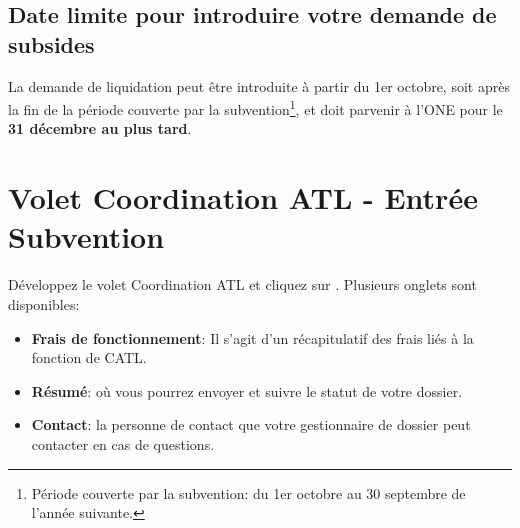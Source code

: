 \subsection{Date limite pour introduire votre demande de subsides}
\begin{attention}
La demande de liquidation peut être introduite à partir du 1er octobre, soit après la fin de la période couverte par la subvention\footnote{Période couverte par la subvention: du 1er octobre au 30 septembre de l'année suivante.},  et doit parvenir à l'ONE pour le \textcolor{rouge}{\textbf{31 décembre au plus tard}}.
\end{attention}



\section{Volet Coordination ATL - Entrée Subvention}
Développez le volet Coordination ATL et cliquez sur . Plusieurs onglets sont disponibles: 
\begin{itemize}
    \item \textbf{Frais de fonctionnement}: Il s’agit d’un récapitulatif des frais liés à la fonction de CATL.
    \item \textbf{Résumé}: où vous pourrez envoyer et suivre le statut de votre dossier. 
    \item \textbf{Contact}: la personne de contact que votre gestionnaire de dossier peut contacter en cas de questions.
\end{itemize}

